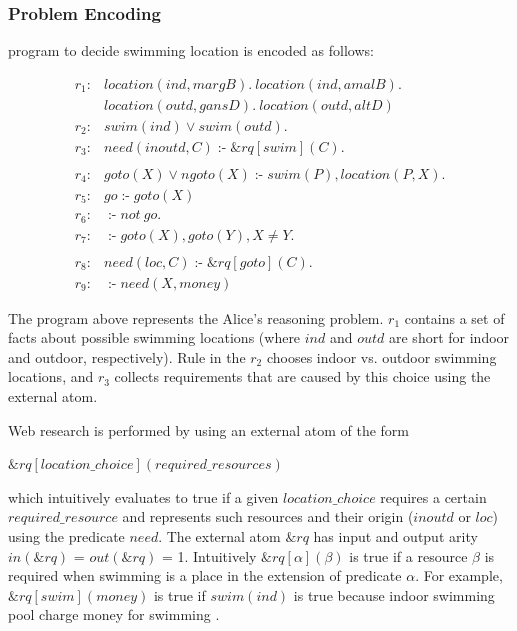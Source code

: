 \documentclass[14pt,a4paper, titlepage]{article}
\newcommand{\ext}[3]{\ensuremath{\&{#1}[#2](#3)}}
\DeclareMathOperator{\leftimpl}{:-}
\begin{document}
\subsubsection{Problem Encoding}
\hex{} program to decide swimming location is encoded as 
follows:
\begin{exmp}
\label{swimExample}
\begin{align*}
r_1\colon& location(ind, margB). \ location(ind, amalB). \ \\& 
location(outd, gansD). \ location(outd, altD) \\  
r_2\colon& swim(ind) \vee swim(outd).\\ 
r_3\colon& need(inoutd, C) \leftimpl \ext{\mathit{rq}}
{\mathit{swim}}{\mathit{C}}. \\
\\
r_4\colon& goto(X) \vee ngoto(X) \leftimpl swim(P), 
location(P, X).\\
r_5\colon& go \leftimpl goto(X)\\
r_6\colon& \leftimpl not \ go. \\
r_7\colon& \leftimpl goto(X), goto(Y), X \neq Y. \\
\\
r_8\colon& \mathit{need}(loc, C) \leftimpl 
\ext{\mathit{rq}}{\mathit{goto}}{\mathit{C}}. \\ 
r_9\colon& \leftimpl need(X, money)
\end{align*}
\end{exmp}
The \hex{} program above represents the Alice's reasoning 
problem. $r_1$ contains a set of facts about possible 
swimming locations (where $\mathit{ind}$ and 
$\mathit{outd}$ are short for indoor and outdoor, 
respectively). Rule in the $r_2$ chooses indoor vs. outdoor 
swimming locations, and $r_3$ collects requirements that 
are caused by this choice using the external atom. 

Web research is performed by using an external atom of the 
form\\ \centerline{$\ext{\mathit{rq}}{\mathit{location\_
choice}}{\mathit{required\_resources}}$} which intuitively 
evaluates to true if a given $\mathit{location\_choice}$ 
requires a certain $\mathit{required\_resource}$ and 
represents such resources  and their origin 
($\mathit{inoutd}$ or $\mathit{loc}$) using the predicate 
$\mathit{need}$. The external atom $\mathit{\&rq}$ has 
input and output arity $\mathit{in(\&rq)}$ = 
$\mathit{out(\&rq)}$ = 1. Intuitively  $\ext{\mathit{rq}}
{\mathit{\alpha}}{\mathit{\beta}}$ is true if a resource 
$\beta$ is required when swimming is a place in the 
extension of predicate $\alpha$. For example, 
$\ext{\mathit{rq}}{\mathit{swim}}{\mathit{money}}$ is true 
if $\mathit{swim(ind)}$ is true because indoor swimming 
pool charge money for swimming \cite{swim}. 
\end{document}
